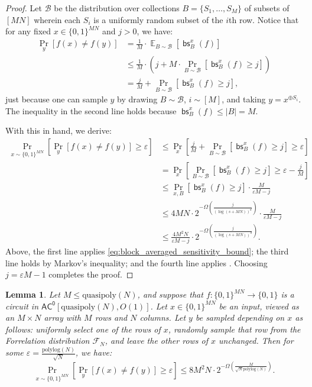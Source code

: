 \documentclass[10pt,a4paper]{article}
\newtheorem{lemma}[theorem]{Lemma}
\newcommand{\eps}{\varepsilon}
\newcommand{\E}{\mathop{\mathbb{E}}}
\newcommand{\polylog}{\mathrm{polylog}}
\newcommand{\quasipoly}{\mathrm{quasipoly}}
\DeclareMathOperator{\bs}{\mathsf{bs}}
\begin{document}
\begin{proof}
Let $\mathcal{B}$ be the distribution over collections $B = \{S_1,\ldots,S_M\}$ of subsets of $[MN]$ wherein each $S_i$ is a uniformly random subset of the $i$th row. Notice that for any fixed $x \in \{0,1\}^{MN}$ and $j > 0$, we have:
\begin{align}
\Pr_y\left[f(x) \neq f(y)\right]
&= \frac{1}{M} \cdot \E_{B \sim \mathcal{B}}\left[\bs^x_B(f)\right]\nonumber\\
&\le \frac{1}{M} \cdot \left(j + M \cdot \Pr_{B \sim \mathcal{B}}\left[\bs^x_B(f) \ge j\right] \right)\nonumber\\
&= \frac{j}{M} + \Pr_{B \sim \mathcal{B}}\left[\bs^x_B(f) \ge j\right],\label{eq:block_averaged_sensitivity_bound}
\end{align}
just because one can sample $y$ by drawing $B \sim \mathcal{B}$, $i \sim [M]$, and taking $y = x^{\oplus S_i}$. The inequality in the second line holds because $\bs^x_B(f) \le |B| = M$.

With this in hand, we derive:
\begin{align*}
\Pr_{x \sim \{0,1\}^{MN}}\left[\Pr_y\left[f(x) \neq f(y)\right] \ge \eps \right]
&\le \Pr_{x}\left[\frac{j}{M} + \Pr_{B \sim \mathcal{B}}\left[\bs^x_B(f) \ge j\right] \ge \eps \right]\\
&= \Pr_{x}\left[\Pr_{B \sim \mathcal{B}}\left[\bs^x_B(f) \ge j\right] \ge \eps - \frac{j}{M} \right]\\
&\le \Pr_{x,B}\left[\bs^x_B(f) \ge j\right] \cdot \frac{M}{\eps M - j}\\
&\le 4MN \cdot 2^{-\Omega\left(\frac{j}{(\log(s + MN))^d}\right)} \cdot \frac{M}{\eps M - j}\\
&\le \frac{4M^2N}{\eps M - j} \cdot 2^{-\Omega\left(\frac{j}{(\log(s + MN))^d}\right)}.
\end{align*}
Above, the first line applies \eqref{eq:block_averaged_sensitivity_bound}; the third line holds by Markov's inequality; and the fourth line applies . Choosing $j = \eps M - 1$ completes the proof.
\end{proof}

\begin{lemma}
\label{lem:ac0_single_forrelated_block_indistinguishable}
Let $M \le \quasipoly(N)$, and suppose that $f: \{0,1\}^{MN} \to \{0,1\}$ is a circuit in $\mathsf{AC^0}[\quasipoly(N), O(1)]$. Let $x \in \{0,1\}^{MN}$ be an input, viewed as an $M \times N$ array with $M$ rows and $N$ columns. Let $y$ be sampled depending on $x$ as follows: uniformly select one of the rows of $x$, randomly sample that row from the Forrelation distribution $\mathcal{F}_N$, and leave the other rows of $x$ unchanged. Then for some $\eps = \frac{\polylog(N)}{\sqrt{N}}$, we have:
\[
\Pr_{x \sim \{0,1\}^{MN}}\left[\Pr_y\left[f(x) \neq f(y)\right] \ge \eps \right] \le 8M^2N \cdot 2^{-\Omega\left(\frac{M}{\sqrt{N} \polylog(N)}\right)}.
\]

\end{lemma}
\end{document}
